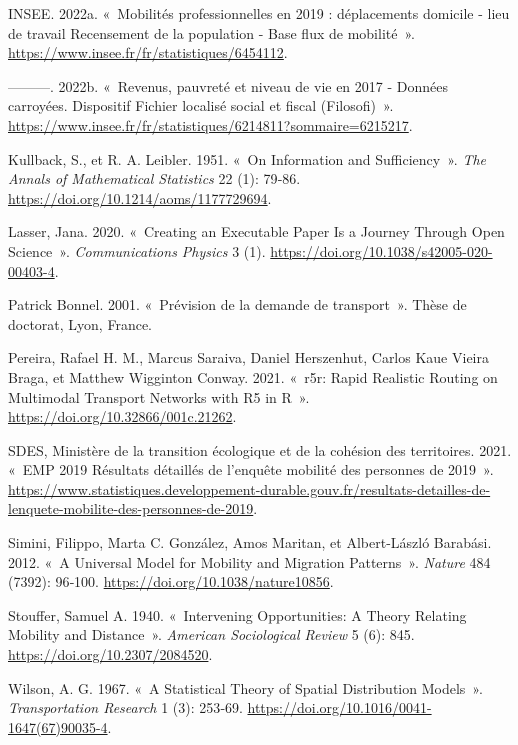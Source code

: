 \documentclass[
  10pt,
  a4paper,
  numbers=noendperiod,
  DIV=9]{scrreprt}
\newlength{\cslhangindent}
\newlength{\cslentryspacingunit} %
\newenvironment{CSLReferences}[2] %
 {%
  \setlength{\parindent}{0pt}
  \ifodd #1
  \let\oldpar\par
  \def\par{\hangindent=\cslhangindent\oldpar}
  \fi
  \setlength{\parskip}{#2\cslentryspacingunit}
 }%
 {}
\begin{document}
\begin{CSLReferences}{1}{0}
\leavevmode{}%
INSEE. 2022a. {«~Mobilités professionnelles en 2019 : déplacements
domicile - lieu de travail Recensement de la population - Base flux de
mobilité~»}. \url{https://www.insee.fr/fr/statistiques/6454112}.

\leavevmode{}%
---------. 2022b. {«~Revenus, pauvreté et niveau de vie en 2017 -
Données carroyées. Dispositif Fichier localisé social et fiscal
(Filosofi)~»}.
\url{https://www.insee.fr/fr/statistiques/6214811?sommaire=6215217}.

\leavevmode{}%
Kullback, S., et R. A. Leibler. 1951. {«~On Information and
Sufficiency~»}. \emph{The Annals of Mathematical Statistics} 22 (1):
79‑86. \url{https://doi.org/10.1214/aoms/1177729694}.

\leavevmode{}%
Lasser, Jana. 2020. {«~Creating an Executable Paper Is a Journey Through
Open Science~»}. \emph{Communications Physics} 3 (1).
\url{https://doi.org/10.1038/s42005-020-00403-4}.

\leavevmode{}%
Patrick Bonnel. 2001. {«~Prévision de la demande de transport~»}. Thèse
de doctorat, Lyon, France.

\leavevmode{}%
Pereira, Rafael H. M., Marcus Saraiva, Daniel Herszenhut, Carlos Kaue
Vieira Braga, et Matthew Wigginton Conway. 2021. {«~r5r: Rapid Realistic
Routing on Multimodal Transport Networks with R5 in R~»}.
\url{https://doi.org/10.32866/001c.21262}.

\leavevmode{}%
SDES, Ministère de la transition écologique et de la cohésion des
territoires. 2021. {«~EMP 2019 Résultats détaillés de l'enquête mobilité
des personnes de 2019~»}.
\url{https://www.statistiques.developpement-durable.gouv.fr/resultats-detailles-de-lenquete-mobilite-des-personnes-de-2019}.

\leavevmode{}%
Simini, Filippo, Marta C. González, Amos Maritan, et Albert-László
Barabási. 2012. {«~A Universal Model for Mobility and Migration
Patterns~»}. \emph{Nature} 484 (7392): 96‑100.
\url{https://doi.org/10.1038/nature10856}.

\leavevmode{}%
Stouffer, Samuel A. 1940. {«~Intervening Opportunities: A Theory
Relating Mobility and Distance~»}. \emph{American Sociological Review} 5
(6): 845. \url{https://doi.org/10.2307/2084520}.

\leavevmode{}%
Wilson, A. G. 1967. {«~A Statistical Theory of Spatial Distribution
Models~»}. \emph{Transportation Research} 1 (3): 253‑69.
\url{https://doi.org/10.1016/0041-1647(67)90035-4}.

\end{CSLReferences}
\end{document}
